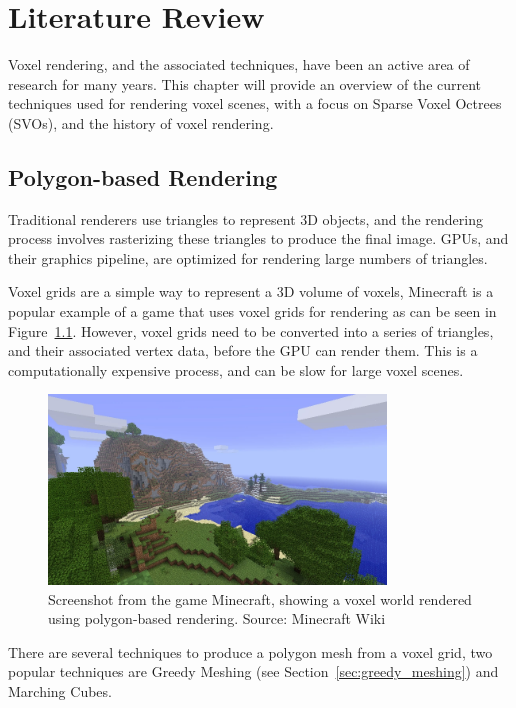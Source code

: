 \chapter{Literature Review}
Voxel rendering, and the associated techniques, have been an active area of research for many years. This chapter will
provide an overview of the current techniques used for rendering voxel scenes, with a focus on Sparse Voxel Octrees (SVOs),
and the history of voxel rendering.

\section{Polygon-based Rendering}
Traditional renderers use triangles to represent 3D objects, and the rendering process involves rasterizing these triangles
to produce the final image. GPUs, and their graphics pipeline, are optimized for rendering large numbers of triangles.

Voxel grids are a simple way to represent a 3D volume of voxels, Minecraft is a popular example of a game that uses voxel
grids for rendering as can be seen in Figure~\ref{fig:minecraft}. However, voxel grids need to be converted into a series
of triangles, and their associated vertex data, before the GPU can render them. This is a computationally expensive process,
and can be slow for large voxel scenes.

\begin{figure}[thp]
    \begin{center}
        \includegraphics[width=0.8\textwidth]{figures/minecraft.png}
    \end{center}
    \caption{Screenshot from the game Minecraft, showing a voxel world rendered using polygon-based rendering. Source: Minecraft Wiki}
    \label{fig:minecraft}
\end{figure}

There are several techniques to produce a polygon mesh from a voxel grid, two popular techniques are Greedy Meshing (see
Section~\ref{sec:greedy_meshing}) and Marching Cubes.

